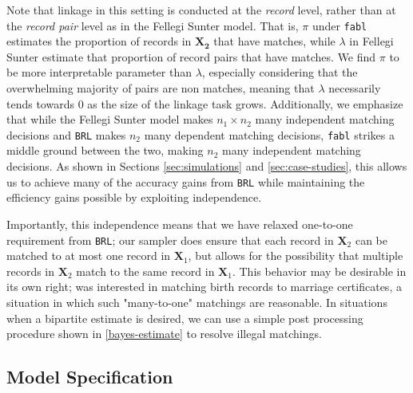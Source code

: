\documentclass[12pt,letterpaper]{article}
\newcommand{\1}[1]{\mathbb{I}\!\left[#1\right]} %
\begin{document}
{Note that linkage in this setting is conducted at the \emph{record} level, rather than at the \emph{record pair} level as in the Fellegi Sunter model. That is, $\pi$ under \texttt{fabl} estimates the proportion of records in $\bm{X_2}$ that have matches, while $\lambda$ in Fellegi Sunter estimate that proportion of record pairs that have matches. We find $\pi$ to be more interpretable parameter than $\lambda$, especially considering that the overwhelming majority of pairs are non matches, meaning that $\lambda$ necessarily tends towards 0 as the size of the linkage task grows. Additionally, we emphasize that while the Fellegi Sunter model makes $n_1 \times n_2$ many independent matching decisions and \texttt{BRL} makes $n_2$ many dependent matching decisions, \texttt{fabl} strikes a middle ground between the two, making $n_2$ many independent matching decisions. As shown in Sections \ref{sec:simulations} and \ref{sec:case-studies}, this allows us to achieve many of the accuracy gains from \texttt{BRL} while maintaining the efficiency gains possible by exploiting independence. 

Importantly, this independence means that we have relaxed one-to-one requirement from \texttt{BRL}; our sampler does ensure that each record in \(\bm{X}_2\) can be matched to at most one record in \(\bm{X}_1\), but allows for the possibility that multiple records in \(\bm{X}_2\) match to the same record in \(\bm{X}_1\). This behavior may be desirable in its own right; \cite{Newcombe1962b} was interested in matching birth records to marriage certificates, a situation in which such "many-to-one" matchings are reasonable. In situations when a bipartite estimate is desired, we can use a simple post processing procedure shown in \ref{bayes-estimate} to resolve illegal matchings.  


\hypertarget{fabl-model}{%
	\subsection{Model Specification}
	\label{model-specification}}

}
\end{document}
